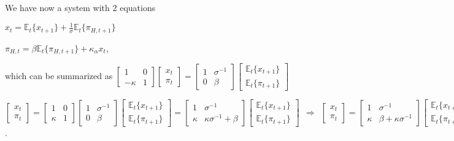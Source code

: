 \documentclass[
]{article}
\begin{document}
We have now a system with 2 equations

\(\displaystyle x_t = \mathbb{E}_t\{x_{t+1}\} +\frac{1}{\sigma}\mathbb{E}_t\{\pi_{H,t+1}\}\)

\(\pi_{H,t}=\beta \mathbb{E}_t\{ \pi_{H,t+1}\} + \kappa_\alpha x_t\),

which can be summarized as
\(\displaystyle \left[ \begin{matrix} 1 & 0\\ -\kappa & 1 \end{matrix} \right] \left[ \begin{matrix} x_t\\ \pi_t \end{matrix} \right] = \left[ \begin{matrix} 1 & \sigma^{-1} \\ 0 & \beta \end{matrix} \right] \left[ \begin{matrix} \mathbb{E}_t\{x_{t+1} \}\\ \mathbb{E}_t \{\pi_{t+1} \} \end{matrix} \right]\)

\(\displaystyle \left[ \begin{matrix} x_t\\ \pi_t \end{matrix} \right] = \left[ \begin{matrix} 1 & 0\\ \kappa & 1 \end{matrix} \right] \left[ \begin{matrix} 1 & \sigma^{-1} \\ 0 & \beta \end{matrix} \right] \left[ \begin{matrix} \mathbb{E}_t\{x_{t+1} \}\\ \mathbb{E}_t \{\pi_{t+1} \} \end{matrix} \right] = \left[ \begin{matrix} 1 & \sigma^{-1} \\ \kappa & \kappa \sigma^{-1}+ \beta \end{matrix} \right] \left[ \begin{matrix} \mathbb{E}_t\{x_{t+1} \}\\ \mathbb{E}_t \{\pi_{t+1} \} \end{matrix} \right] \ \ \Rightarrow \ \ \left[ \begin{matrix} x_t\\ \pi_t \end{matrix} \right] = \left[ \begin{matrix} 1 & \sigma^{-1} \\ \kappa & \beta +\kappa \sigma^{-1} \end{matrix} \right] \left[ \begin{matrix} \mathbb{E}_t\{x_{t+1} \}\\ \mathbb{E}_t \{\pi_{t+1} \} \end{matrix} \right]\).
\end{document}
